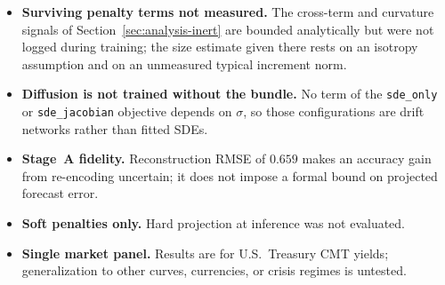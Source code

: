 \documentclass{article} %
\begin{document}
\begin{itemize}
  because the rolling refit duplicated observations. Persistence is therefore the
  only valid external benchmark in this report.
  \item \textbf{Surviving penalty terms not measured.} The cross-term and
  curvature signals of Section~\ref{sec:analysis-inert} are bounded analytically but
  were not logged during training; the size estimate given there rests on an isotropy
  assumption and on an unmeasured typical increment norm.
  \item \textbf{Diffusion is not trained without the bundle.} No term of the
  \texttt{sde\_only} or \texttt{sde\_jacobian} objective depends on $\sigma$, so
  those configurations are drift networks rather than fitted SDEs.
  \item \textbf{Stage~A fidelity.} Reconstruction RMSE of $0.659$ makes an accuracy
  gain from re-encoding uncertain; it does not impose a formal bound on projected
  forecast error.
  \item \textbf{Soft penalties only.} Hard projection at inference was not evaluated.
  \item \textbf{Single market panel.} Results are for U.S.\ Treasury CMT yields;
  generalization to other curves, currencies, or crisis regimes is untested.
\end{itemize}
\end{document}
